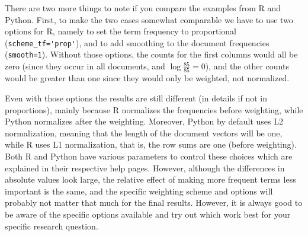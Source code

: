 There are two more things to note if you compare the examples from R and Python.
First, to make the two cases somewhat comparable we have to use two options for R, namely to set the term frequency to proportional (\verb|scheme_tf='prop'|),
and to add smoothing to the document frequencies (\verb|smooth=1|).
Without those options, the counts for the first columns would all be zero (since they occur in all documents, and $\log \frac{85}{85}=0$),
and the other counts would be greater than one since they would only be weighted, not normalized.

Even with those options the results are still different (in details if not in proportions),
mainly because R normalizes the frequencies before weighting, while Python normalizes after the weighting.
Moreover, Python by default uses L2 normalization, meaning that the length of the document vectors will be one,
while R uses L1 normalization, that is, the row sums are one (before weighting).
Both R and Python have various parameters to control these choices which are explained in their respective help pages.
However, although the differences in absolute values look large, the relative effect of making more frequent terms less important is the same,
and the specific weighting scheme and options will probably not matter that much for the final results.
However, it is always good to be aware of the specific options available and try out which work best for your specific research question.




